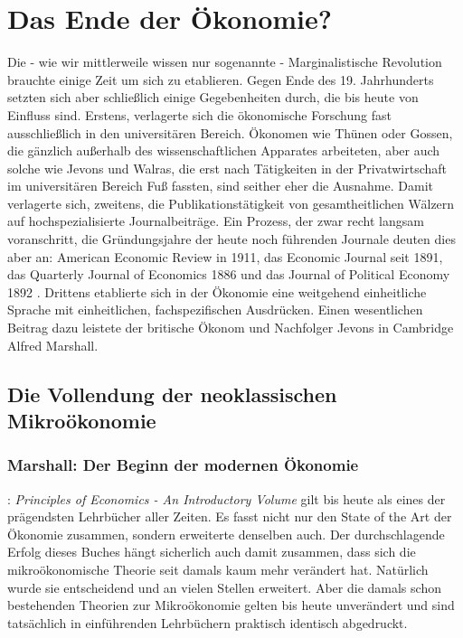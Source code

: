 %
%
%

\chapter{Das Ende der Ökonomie?}
\label{Neoklassik}

Die - wie wir mittlerweile wissen nur sogenannte - Marginalistische Revolution brauchte einige Zeit um sich zu etablieren. Gegen Ende des 19. Jahrhunderts setzten sich aber schließlich einige Gegebenheiten durch, die bis heute von Einfluss sind. Erstens, verlagerte sich die ökonomische Forschung fast ausschließlich in den universitären Bereich. Ökonomen wie Thünen oder Gossen, die gänzlich außerhalb des wissenschaftlichen Apparates arbeiteten, aber auch solche wie Jevons und Walras, die erst nach Tätigkeiten in der Privatwirtschaft im universitären Bereich Fuß fassten, sind seither eher die Ausnahme. Damit verlagerte sich, zweitens, die Publikationstätigkeit von gesamtheitlichen Wälzern auf hochspezialisierte Journalbeiträge. Ein Prozess, der zwar recht langsam voranschritt, die Gründungsjahre der heute noch führenden Journale deuten dies aber an: American Economic Review in 1911, das Economic Journal seit 1891, das Quarterly Journal of Economics 1886 und das Journal of Political Economy 1892 \parencite[S. 340]{Rosner2012}.
Drittens etablierte sich in der Ökonomie eine weitgehend einheitliche Sprache mit einheitlichen, fachspezifischen Ausdrücken. Einen wesentlichen Beitrag dazu leistete der britische Ökonom und Nachfolger Jevons in Cambridge Alfred Marshall.

\section{Die Vollendung der neoklassischen Mikroökonomie}

\subsection{Marshall: Der Beginn der modernen Ökonomie}

\textcite{Marshall1890}: \textit{Principles of Economics - An Introductory Volume} gilt bis heute als eines der prägendsten Lehrbücher aller Zeiten. Es fasst nicht nur den State of the Art der Ökonomie zusammen, sondern erweiterte denselben auch. Der durchschlagende Erfolg dieses Buches hängt sicherlich auch damit zusammen, dass sich die mikroökonomische Theorie seit damals kaum mehr verändert hat. Natürlich wurde sie entscheidend und an vielen Stellen erweitert. Aber die damals schon bestehenden Theorien zur Mikroökonomie gelten bis heute unverändert und sind tatsächlich in einführenden Lehrbüchern praktisch identisch abgedruckt.

